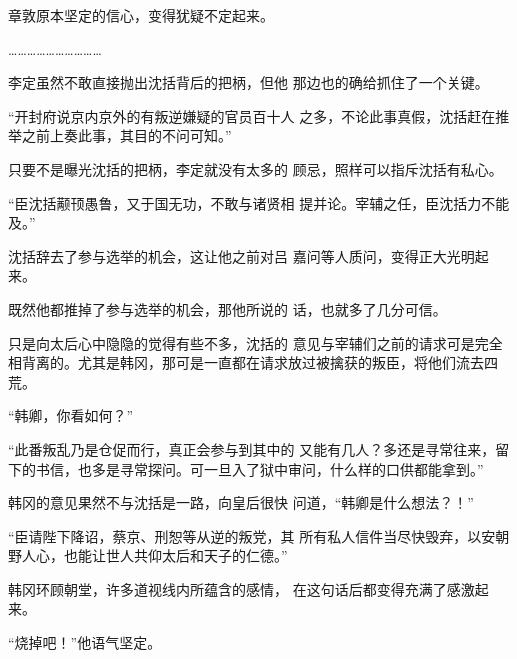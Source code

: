 章敦原本坚定的信心，变得犹疑不定起来。

…………………………

李定虽然不敢直接抛出沈括背后的把柄，但他 那边也的确给抓住了一个关键。

“开封府说京内京外的有叛逆嫌疑的官员百十人 之多，不论此事真假，沈括赶在推举之前上奏此事，其目的不问可知。”

只要不是曝光沈括的把柄，李定就没有太多的 顾忌，照样可以指斥沈括有私心。

“臣沈括颟顸愚鲁，又于国无功，不敢与诸贤相 提并论。宰辅之任，臣沈括力不能及。”

沈括辞去了参与选举的机会，这让他之前对吕 嘉问等人质问，变得正大光明起来。

既然他都推掉了参与选举的机会，那他所说的 话，也就多了几分可信。

只是向太后心中隐隐的觉得有些不多，沈括的 意见与宰辅们之前的请求可是完全相背离的。尤其是韩冈，那可是一直都在请求放过被擒获的叛臣，将他们流去四荒。

“韩卿，你看如何？”

“此番叛乱乃是仓促而行，真正会参与到其中的 又能有几人？多还是寻常往来，留下的书信，也多是寻常探问。可一旦入了狱中审问，什么样的口供都能拿到。”

韩冈的意见果然不与沈括是一路，向皇后很快 问道，“韩卿是什么想法？！”

“臣请陛下降诏，蔡京、刑恕等从逆的叛党，其 所有私人信件当尽快毁弃，以安朝野人心，也能让世人共仰太后和天子的仁德。”

韩冈环顾朝堂，许多道视线内所蕴含的感情， 在这句话后都变得充满了感激起来。

“烧掉吧！”他语气坚定。

